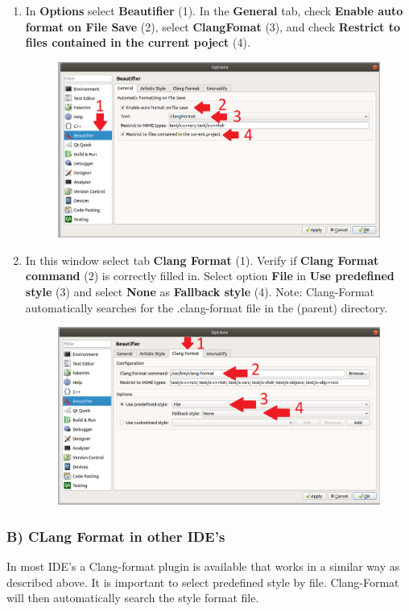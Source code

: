 \documentclass[10pt]{article}
\begin{document}
\begin{enumerate}
\item In \textbf{Options} select \textbf{Beautifier} (1). In the \textbf{General} tab, check \textbf{Enable auto format on File Save} (2),
select \textbf{ClangFomat} (3), and check \textbf{Restrict to files contained in the current poject} (4).
\begin{figure}[h!]
\centering
\includegraphics[width=0.7 \textwidth]{clang-format4.png}
\end{figure}

\newpage

\item In this window select tab \textbf{Clang Format} (1). Verify if \textbf{Clang Format command} (2) is correctly
filled in. Select option \textbf{File} in \textbf{Use predefined style} (3) and select \textbf{None} as \textbf{Fallback style} (4).
Note: Clang-Format automatically searches for the .clang-format file in the (parent) directory.
\begin{figure}[h!]
\centering
\includegraphics[width=0.7 \textwidth]{clang-format5.png}
\end{figure}
\end{enumerate}

\subsubsection*{B) CLang Format in other IDE's}
In most IDE’s a Clang-format plugin is available that works in a similar way as described above. It is important to select predefined style by file. Clang-Format will then automatically search the style format file. 
\end{document}
